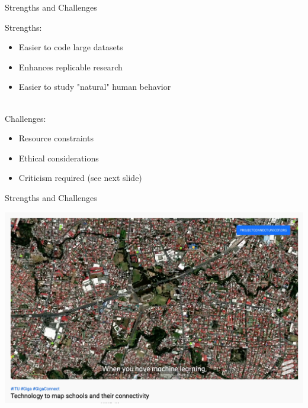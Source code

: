 \documentclass[handout]{beamer}
\begin{document}
\begin{frame}{Strengths and Challenges} 
	
Strengths:
\begin{itemize}
	\item Easier to code large datasets
	\item Enhances replicable research
	\item Easier to study "natural" human behavior \\\
\end{itemize}
	
Challenges:
\begin{itemize}
	\item Resource constraints
	\item Ethical considerations
	\item Criticism required (see next slide)
\end{itemize}



\end{frame}


\begin{frame}{Strengths and Challenges}
	
	
\begin{center}
	\includegraphics[width=\linewidth,height=\textheight,keepaspectratio]{../pictures/ericsson.png} \\\
\end{center}

\end{frame}
	
\end{document}
